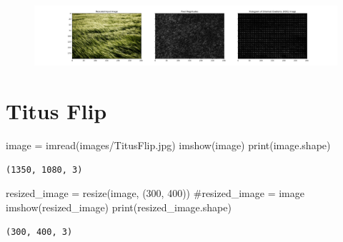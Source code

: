 \documentclass[
  letterpaper,
]{report}
\newenvironment{Shaded}{\begin{snugshade}}{\end{snugshade}}
\newcommand{\BuiltInTok}[1]{\textcolor[rgb]{0.00,0.23,0.31}{#1}}
\newcommand{\CommentTok}[1]{\textcolor[rgb]{0.37,0.37,0.37}{#1}}
\newcommand{\DecValTok}[1]{\textcolor[rgb]{0.68,0.00,0.00}{#1}}
\newcommand{\NormalTok}[1]{\textcolor[rgb]{0.00,0.23,0.31}{#1}}
\newcommand{\OperatorTok}[1]{\textcolor[rgb]{0.37,0.37,0.37}{#1}}
\newcommand{\StringTok}[1]{\textcolor[rgb]{0.13,0.47,0.30}{#1}}
\begin{document}
\begin{figure}[H]

{\centering \includegraphics{results_files/figure-pdf/unnamed-chunk-33-6.pdf}

}

\end{figure}

\hypertarget{titus-flip}{%
\section{Titus Flip}\label{titus-flip}}

\begin{Shaded}
\begin{Highlighting}[]
\NormalTok{image }\OperatorTok{=}\NormalTok{ imread(}\StringTok{\textquotesingle{}images/TitusFlip.jpg\textquotesingle{}}\NormalTok{)}
\NormalTok{imshow(image)}
\BuiltInTok{print}\NormalTok{(image.shape)}
\end{Highlighting}
\end{Shaded}

\begin{verbatim}
(1350, 1080, 3)
\end{verbatim}

\begin{Shaded}
\begin{Highlighting}[]
\NormalTok{resized\_image }\OperatorTok{=}\NormalTok{ resize(image, (}\DecValTok{300}\NormalTok{, }\DecValTok{400}\NormalTok{))}
\CommentTok{\#resized\_image = image}
\NormalTok{imshow(resized\_image)}
\BuiltInTok{print}\NormalTok{(resized\_image.shape)}
\end{Highlighting}
\end{Shaded}

\begin{verbatim}
(300, 400, 3)
\end{verbatim}
\end{document}
